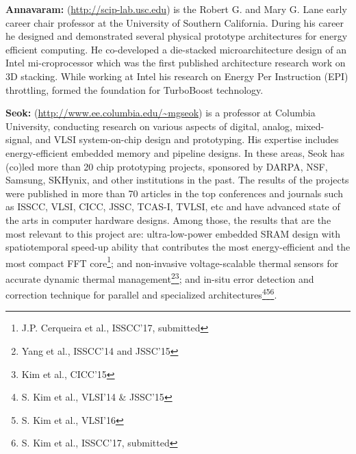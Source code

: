 \noindent
\textbf{Annavaram:} (\url{http://scip-lab.usc.edu}) is the Robert G. and Mary G. Lane early career chair professor at the University of Southern California. 
During his career he designed and demonstrated several physical prototype architectures for energy efficient computing. 
He co-developed a die-stacked microarchitecture design of an Intel mi-croprocessor which was the first published architecture research work on 3D stacking. 
While working at Intel his research on Energy Per Instruction (EPI) throttling, formed the foundation for TurboBoost technology.

\noindent
\textbf{Seok:} (\url{http://www.ee.columbia.edu/~mgseok}) is a professor at Columbia University, conducting research on various aspects of digital, analog, mixed-signal, and VLSI system-on-chip design and prototyping. His expertise includes energy-efficient embedded memory and pipeline designs. In these areas, Seok has (co)led more than 20 chip prototyping projects, sponsored by DARPA, NSF, Samsung, SKHynix, and other institutions in the past. The results of the projects were published in more than 70 articles in the top conferences and journals such as ISSCC, VLSI, CICC, JSSC, TCAS-I, TVLSI, etc and have advanced state of the arts in computer hardware designs. 
Among those, the results that are the most relevant to this project are: ultra-low-power embedded SRAM design with spatiotemporal speed-up ability that contributes the most energy-efficient and the most compact FFT core\footnote{J.P. Cerqueira et al., ISSCC'17, submitted}; and non-invasive voltage-scalable thermal sensors for accurate dynamic thermal management\footnote{Yang et al., ISSCC'14 and JSSC'15}\footnote{Kim et al., CICC'15}; and in-situ error detection and correction technique for parallel and specialized architectures\footnote{S. Kim et al., VLSI'14 & JSSC'15}\footnote{S. Kim et al., VLSI'16}\footnote{S. Kim et al., ISSCC'17, submitted}. 
